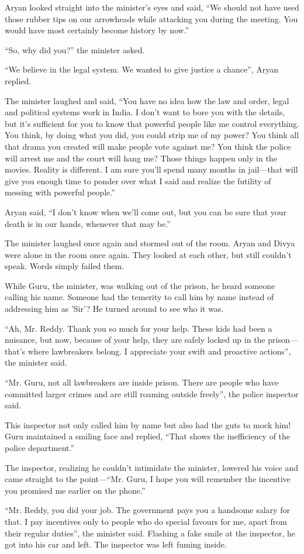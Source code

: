 Aryan looked straight into the minister's eyes and said, “We should not have
used those rubber tips on our arrowheads while attacking you during the meeting.
You would have most certainly become history by now.”

“So, why did you?” the minister asked.

“We believe in the legal system. We wanted to give justice a chance”, Aryan
replied.

The minister laughed and said, “You have no idea how the law and order, legal
and political systems work in India. I don't want to bore you with the details,
but it's sufficient for you to know that powerful people like me control
everything. You think, by doing what you did, you could strip me of my power?
You think all that drama you created will make people vote against me? You think
the police will arrest me and the court will hang me? Those things happen only
in the movies. Reality is different. I am sure you'll spend many months in
jail—that will give you enough time to ponder over what I said and realize the
futility of messing with powerful people.”

Aryan said, “I don't know when we'll come out, but you can be sure that your
death is in our hands, whenever that may be.”

The minister laughed once again and stormed out of the room. Aryan and Divya
were alone in the room once again. They looked at each other, but still couldn't
speak. Words simply failed them.

While Guru, the minister, was walking out of the prison, he heard someone
calling his name. Someone had the temerity to call him by name instead of
addressing him as 'Sir'? He turned around to see who it was.

“Ah, Mr. Reddy. Thank you so much for your help. These kids had been a nuisance, but
now, because of your help, they are safely locked up in the prison—that's where
lawbreakers belong. I appreciate your swift and proactive actions”, the minister
said.

“Mr. Guru, not all lawbreakers are inside prison. There are people who have
committed larger crimes and are still roaming outside freely”, the police
inspector said.

This inspector not only called him by name but also had the guts to mock him!
Guru maintained a smiling face and replied, “That shows the inefficiency of the
police department.”

The inspector, realizing he couldn't intimidate the minister, lowered his voice
and came straight to the point—“Mr. Guru, I hope you will remember the incentive
you promised me earlier on the phone.”

“Mr. Reddy, you did your job. The government pays you a handsome salary for that. I
pay incentives only to people who do special favours for me, apart from their
regular duties”, the minister said. Flashing a fake smile at the inspector, he
got into his car and left.  The inspector was left fuming inside.